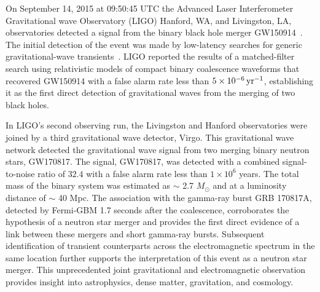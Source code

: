 On September 14, 2015 at 09:50:45 UTC the Advanced Laser Interferometer Gravitational wave Observatory (LIGO) Hanford, WA, and Livingston, LA, observatories detected a signal from the binary black hole merger GW150914~\cite{GW150914-DETECTION}. The initial detection of the event was made by low-latency searches for generic gravitational-wave transients~\cite{GW150914-BURST}. LIGO reported the results of a matched-filter search using relativistic models of compact binary coalescence waveforms that recovered GW150914 with a false alarm rate less than $5 \times 10^{-6}\,\text{yr}^{-1}$, establishing it as the first direct detection of gravitational waves from the merging of two black holes.

In LIGO's second observing run, the Livingston and Hanford observatories were joined by a third gravitational wave detector, Virgo. This gravitational wave network detected the gravitational wave signal from two merging binary neutron stars, GW170817. The signal, GW170817, was detected with a combined signal-to-noise ratio of $32.4$ with a false alarm rate less than $1 \times 10^6$ years. The total mass of the binary system was estimated as $\sim$ 2.7 $M_\odot$ and at a luminosity distance of $\sim$ 40 Mpc. The association with the gamma-ray burst GRB 170817A, detected by Fermi-GBM 1.7 seconds after the coalescence, corroborates the hypothesis of a neutron star merger and provides the first direct evidence of a link between these mergers and short gamma-ray bursts. Subsequent identification of transient counterparts across the electromagnetic spectrum in the same location further supports the interpretation of this event as a neutron star merger. This unprecedented joint gravitational and electromagnetic observation provides insight into astrophysics, dense matter, gravitation, and cosmology.

